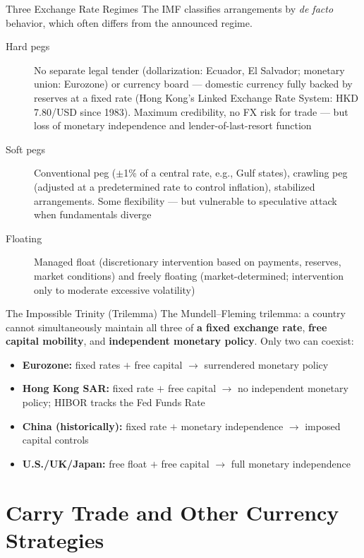 \documentclass[aspectratio=169]{beamer}
\begin{document}
\begin{frame}{Three Exchange Rate Regimes}
The IMF classifies arrangements by \emph{de facto} behavior, which often differs from the announced regime.
\begin{description}
  \item[Hard pegs] No separate legal tender (dollarization: Ecuador, El Salvador; monetary union: Eurozone) or currency board --- domestic currency fully backed by reserves at a fixed rate (Hong Kong's Linked Exchange Rate System: HKD 7.80/USD since 1983). Maximum credibility, no FX risk for trade --- but loss of monetary independence and lender-of-last-resort function
  \item[Soft pegs] Conventional peg ($\pm$1\% of a central rate, e.g., Gulf states), crawling peg (adjusted at a predetermined rate to control inflation), stabilized arrangements. Some flexibility --- but vulnerable to speculative attack when fundamentals diverge
  \item[Floating] Managed float (discretionary intervention based on payments, reserves, market conditions) and freely floating (market-determined; intervention only to moderate excessive volatility)
\end{description}
\end{frame}

\begin{frame}{The Impossible Trinity (Trilemma)}
The Mundell--Fleming trilemma: a country cannot simultaneously maintain all three of \textbf{a fixed exchange rate}, \textbf{free capital mobility}, and \textbf{independent monetary policy}. Only two can coexist:
\begin{itemize}
  \item \textbf{Eurozone:} fixed rates $+$ free capital $\to$ surrendered monetary policy
  \item \textbf{Hong Kong SAR:} fixed rate $+$ free capital $\to$ no independent monetary policy; HIBOR tracks the Fed Funds Rate
  \item \textbf{China (historically):} fixed rate $+$ monetary independence $\to$ imposed capital controls
  \item \textbf{U.S./UK/Japan:} free float $+$ free capital $\to$ full monetary independence
\end{itemize}
\end{frame}


\section{Carry Trade and Other Currency Strategies}
\end{document}
